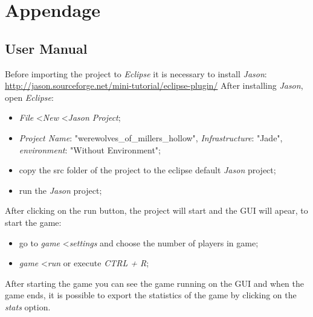 \documentclass{article}
\begin{document}
\section{Appendage}
\subsection{User Manual}
Before importing the project to \textit{Eclipse} it is necessary to install \textit{Jason}:
\newline
\url{http://jason.sourceforge.net/mini-tutorial/eclipse-plugin/} 
After installing \textit{Jason}, open \textit{Eclipse}:
\begin{itemize}
	\item \textit{File} \textless \textit{New} \textless \textit{Jason Project};
	\item \textit{Project Name}: "werewolves\_of\_millers\_hollow", \textit{Infrastructure}: "Jade", \textit{environment}: "Without Environment";
	\item copy the src folder of the project to the eclipse default \textit{Jason} project;
	\item run the \textit{Jason} project;
\end{itemize}

After clicking on the run button, the project will start and the GUI will apear, to start the game:
\begin{itemize}
	\item go to \textit{game} \textless \textit{settings} and choose the number of players in game;
	\item \textit{game} \textless \textit{run} or execute \textit{CTRL + R};
\end{itemize}
After starting the game you can see the game running on the GUI and when the game ends, it is possible to export the statistics of the game by clicking on the \textit{stats} option.
\end{document}
